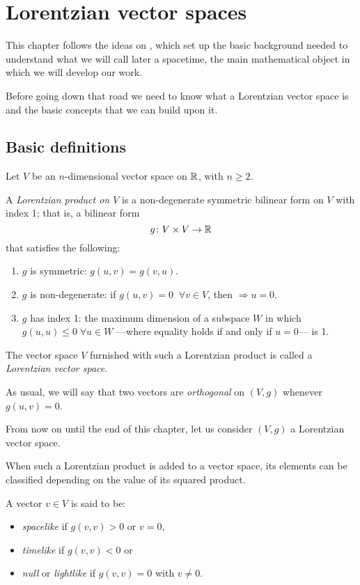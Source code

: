 \chapter{Lorentzian vector spaces}
\label{chapter:lorentzian}

This chapter follows the ideas on \cite{romero10}, which set up the basic background needed to understand what we will call later a spacetime, the main mathematical object in which we will develop our work.

Before going down that road we need to know what a Lorentzian vector space is and the basic concepts that we can build upon it.

\section{Basic definitions}

\begin{definition}
	\label{def:lorentzianprod}
	Let $V$ be an $n$-dimensional vector space on $\mathbb{R}$, with $n \geq 2$.
	
	A \emph{Lorentzian product on $V$} is a non-degenerate symmetric bilinear form on $V$ with index 1; that is, a bilinear form
	\[
		g \colon V \times V \to \mathbb{R}
	\]
	that satisfies the following:
	\begin{enumerate}
		\item $g$ is symmetric: $g(u, v) = g(v, u)$.
		\item $g$ is non-degenerate: if $g(u, v) = 0 \;\; \forall v \in V$, then $\Rightarrow u = 0$.
		\item $g$ has index 1: the maximum dimension of a subspace $W$ in which $g(u,u) \leq 0 \; \forall u \in W$ ---where equality holds if and only if $u = 0$--- is 1.
	\end{enumerate}

	The vector space $V$ furnished with such a Lorentzian product is called a \emph{Lorentzian vector space}.
\end{definition}

As usual, we will say that two vectors are \emph{orthogonal} on $(V,g)$ whenever $g(u,v) = 0$.

From now on until the end of this chapter, let us consider $(V,g)$ a Lorentzian vector space.

When such a Lorentzian product is added to a vector space, its elements can be classified depending on the value of its squared product.

\begin{definition}
	A vector $v \in V$ is said to be:
	\begin{itemize}
		\item \emph{spacelike} if $g(v,v) > 0$ or $v = 0$,
		\item \emph{timelike} if $g(v,v) < 0$ or
		\item \emph{null} or \emph{lightlike} if $g(v,v) = 0$ with $v \neq 0$.
	\end{itemize}
\end{definition}

